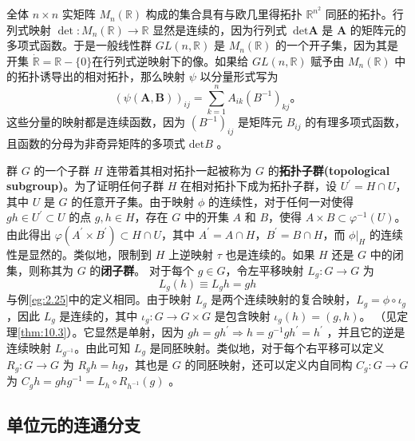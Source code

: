 \begin{eg}\label{eg:10.20}
全体 $n\times n$ 实矩阵 $M_{n} (\mathbb{R} )$ 构成的集合具有与欧几里得拓扑 $\mathbb{R}^{n^{2}}$ 同胚的拓扑。行列式映射 $\det :M_{n} (\mathbb{R} )\rightarrow \mathbb{R}$ 显然是连续的，因为行列式 $ \ \mathrm{det}\mathbf{A}$ 是 $ \mathbf{A}$ 的矩阵元的多项式函数。于是一般线性群 $GL(n,\mathbb{R} )$ 是 $M_{n} (\mathbb{R} )$ 的一个开子集，因为其是开集 $\dot{\mathbb{R}} =\mathbb{R} -\{0\}$在行列式逆映射下的像。如果给 $GL(n,\mathbb{R} )$ 赋予由 $M_{n} (\mathbb{R} )$ 中的拓扑诱导出的相对拓扑，那么映射 $\psi $ 以分量形式写为
\begin{equation*}
    ( \psi (\mathbf{A} ,\mathbf{B} ))_{ij} =\sum _{k=1}^{n} A_{ik}\left( B^{-1}\right)_{kj} 。
\end{equation*}
这些分量的映射都是连续函数，因为 $(B^{-1} )_{ij}$ 是矩阵元 $B_{ij}$ 的有理多项式函数，且函数的分母为非奇异矩阵的多项式 $ \mathrm{det} B$ 。
\end{eg}

	群 $G$ 的一个子群 $H$ 连带着其相对拓扑一起被称为 $G$ 的\textbf{拓扑子群(topological subgroup)}。为了证明任何子群 $H$ 在相对拓扑下成为拓扑子群，设 $U^{\prime}=H\cap U$，其中 $U$ 是 $G$ 的任意开子集。由于映射 $\phi $ 的连续性，对于任何一对使得 $gh\in U^{\prime}\subset U$ 的点 $g,h\in H$，存在 $G$ 中的开集 $A$ 和 $B$，使得 $A\times B\subset \varphi ^{-1} (U)$。由此得出 $\varphi (A^{\prime}\times B^{\prime})\subset H\cap U$，其中 $A^{\prime}=A\cap H$，$B^{\prime}=B\cap H$，而 $ \phi |_{H}$ 的连续性是显然的。类似地，限制到 $H$ 上逆映射 $\tau $ 也是连续的。如果 $H$ 还是 $G$ 中的闭集，则称其为 $G$ 的\textbf{闭子群}。
	对于每个 $g\in G$，令左平移映射 $L_{g} :G\rightarrow G$ 为
\begin{equation*}
    L_{g} (h)\equiv L_{g} h=gh
\end{equation*}
与例\ref{eg:2.25}中的定义相同。由于映射 $L_{g}$ 是两个连续映射的复合映射，$L_{g} =\phi \circ \iota _{g}$，因此 $L_{g}$ 是连续的，其中 $\iota _{g} :G\rightarrow G\times G$ 是包含映射 $\iota _{g} (h)=(g,h)$。
（见定理\ref{thm:10.3}）。它显然是单射，因为 $gh=gh^{\prime}\Longrightarrow h=g^{-1} gh^{\prime}=h^{\prime}$ ，并且它的逆是连续映射 $L_{g^{-1}}$。由此可知 $L_{g}$ 是同胚映射。类似地，对于每个右平移可以定义 $R_{g} :G\rightarrow G$ 为 $R_{g} h=hg$，其也是 $G$ 的同胚映射，还可以定义内自同构 $C_{g} :G\rightarrow G$ 为 $C_{g} h=ghg^{-1} =L_{h} \circ R_{h^{-1}}( g)$ 。

\subsection{单位元的连通分支}

